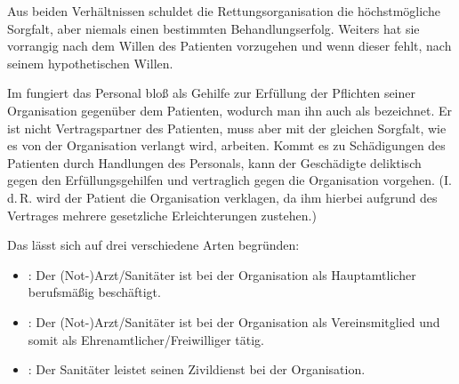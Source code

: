 {Aus beiden Verhältnissen schuldet die
Rettungsorganisation die höchstmögliche Sorgfalt, aber
niemals einen bestimmten Behandlungserfolg. Weiters hat sie
vorrangig nach dem Willen des Patienten vorzugehen und wenn
dieser fehlt, nach seinem hypothetischen Willen.

Im 
fungiert das Personal bloß als Gehilfe zur Erfüllung der
Pflichten seiner Organisation gegenüber dem Patienten,
wodurch man ihn auch als
 bezeichnet. Er ist
nicht Vertragspartner des Patienten, muss aber mit der
gleichen Sorgfalt, wie es von der Organisation verlangt
wird, arbeiten. Kommt es zu Schädigungen des Patienten durch
Handlungen des Personals, kann der Geschädigte deliktisch
gegen den Erfüllungsgehilfen und vertraglich gegen die
Organisation vorgehen. (I.\,d.\,R. wird der Patient die
Organisation verklagen, da ihm hierbei aufgrund des
Vertrages mehrere gesetzliche Erleichterungen zustehen.)

Das  lässt sich auf drei verschiedene Arten begründen:

\begin{itemize}
    \item {}: Der (Not-)Arzt/Sanitäter ist
    bei der Organisation als Hauptamtlicher berufsmäßig
    beschäftigt.
    
    \item {}: Der
    (Not-)Arzt/Sanitäter ist bei der Organisation als
    Vereinsmitglied und somit als
    Ehrenamtlicher/Freiwilliger tätig.
    
    \item {}: Der Sanitäter leistet seinen
    Zivildienst bei der Organisation.
    
\end{itemize}

}
